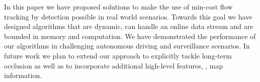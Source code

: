 \documentclass[10pt,twocolumn,letterpaper]{article}
\begin{document}
In this paper we have proposed solutions to make the use of min-cost flow  tracking by detection possible in real world scenarios. Towards this goal we have designed algorithms that are dynamic, can handle an online data stream and are bounded in memory and computation. 
We have demonstrated the performance of our algorithms in challenging autonomous driving and surveillance scenarios. 
In future work we plan to extend our approach to explicitly tackle long-term occlusion as well as to  incorporate additional high-level features, \eg, map information.   
{\small


}
\end{document}
